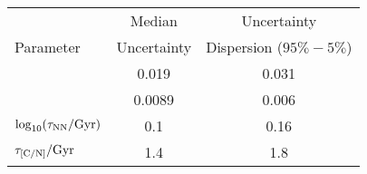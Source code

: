\begin{tabular}{l|cc}
\hline\hline
 & Median & Uncertainty  \\
Parameter & Uncertainty & Dispersion ($95\% - 5\%$) \\
\hline
[O/H] & 0.019 & 0.031 \\
[Fe/H] & 0.0089 & 0.006 \\
$\log_{10}(\tau_{\rm NN}/{\rm Gyr})$ & 0.1 & 0.16 \\
$\tau_{\rm [C/N]}/{\rm Gyr}$ & 1.4 & 1.8 \\
\hline
\end{tabular}

